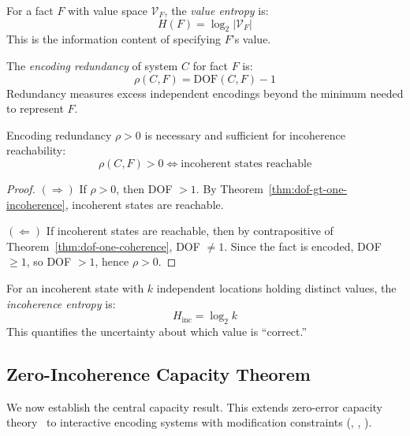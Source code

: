 \begin{definition}\label{def:value-entropy}
For a fact $F$ with value space $\mathcal{V}_F$, the \emph{value entropy} is:
\[
H(F) = \log_2 |\mathcal{V}_F|
\]
This is the information content of specifying $F$'s value.
\end{definition}

\begin{definition}\label{def:redundancy}
The \emph{encoding redundancy} of system $C$ for fact $F$ is:
\[
\rho(C, F) = \text{DOF}(C, F) - 1
\]
Redundancy measures excess independent encodings beyond the minimum needed to represent $F$.
\end{definition}

\begin{theorem}\label{thm:redundancy-incoherence}
Encoding redundancy $\rho > 0$ is necessary and sufficient for incoherence reachability:
\[
\rho(C, F) > 0 \Longleftrightarrow \text{incoherent states reachable}
\]
\end{theorem}

\begin{proof}
$(\Rightarrow)$ If $\rho > 0$, then DOF $> 1$. By Theorem~\ref{thm:dof-gt-one-incoherence}, incoherent states are reachable.

$(\Leftarrow)$ If incoherent states are reachable, then by contrapositive of Theorem~\ref{thm:dof-one-coherence}, DOF $\neq 1$. Since the fact is encoded, DOF $\geq 1$, so DOF $> 1$, hence $\rho > 0$.
\end{proof}

\begin{definition}\label{def:incoherence-entropy}
For an incoherent state with $k$ independent locations holding distinct values, the \emph{incoherence entropy} is:
\[
H_{\text{inc}} = \log_2 k
\]
This quantifies the uncertainty about which value is ``correct.''
\end{definition}

\subsection{Zero-Incoherence Capacity Theorem}\label{sec:capacity}

We now establish the central capacity result. This extends zero-error capacity theory~\cite{korner1973graphs,lovasz1979shannon} to interactive encoding systems with modification constraints (, , ).

